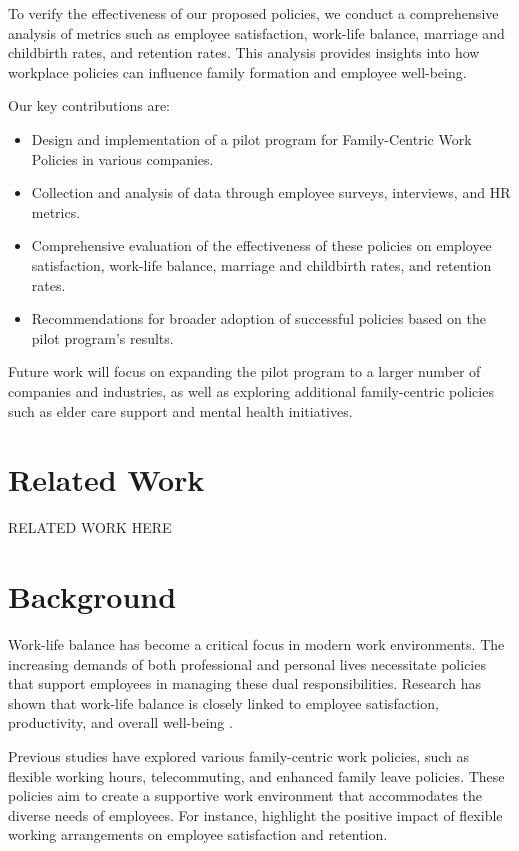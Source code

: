 \documentclass{article} %
\begin{document}
To verify the effectiveness of our proposed policies, we conduct a comprehensive analysis of metrics such as employee satisfaction, work-life balance, marriage and childbirth rates, and retention rates. This analysis provides insights into how workplace policies can influence family formation and employee well-being.

Our key contributions are:
\begin{itemize}
    \item Design and implementation of a pilot program for Family-Centric Work Policies in various companies.
    \item Collection and analysis of data through employee surveys, interviews, and HR metrics.
    \item Comprehensive evaluation of the effectiveness of these policies on employee satisfaction, work-life balance, marriage and childbirth rates, and retention rates.
    \item Recommendations for broader adoption of successful policies based on the pilot program's results.
\end{itemize}

Future work will focus on expanding the pilot program to a larger number of companies and industries, as well as exploring additional family-centric policies such as elder care support and mental health initiatives.

\section{Related Work}
\label{sec:related}
RELATED WORK HERE

\section{Background}
\label{sec:background}

Work-life balance has become a critical focus in modern work environments. The increasing demands of both professional and personal lives necessitate policies that support employees in managing these dual responsibilities. Research has shown that work-life balance is closely linked to employee satisfaction, productivity, and overall well-being \cite{park2023generative}.

Previous studies have explored various family-centric work policies, such as flexible working hours, telecommuting, and enhanced family leave policies. These policies aim to create a supportive work environment that accommodates the diverse needs of employees. For instance, \citet{shanahan2023role} highlight the positive impact of flexible working arrangements on employee satisfaction and retention.
\end{document}
